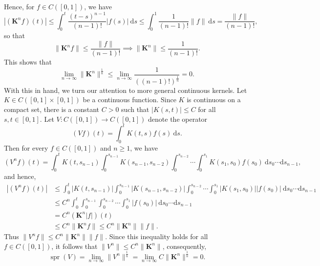 \documentclass[11pt]{article}
\theoremstyle{thmstyle}
\theoremstyle{defstyle}
\renewcommand{\le}{\leqslant}
\renewcommand{\ge}{\geqslant}
\newcommand{\spr}{\operatorname{spr}}
\begin{document}
Hence, for $f\in C([0, 1])$, we have 
\begin{equation*}
    \left|(\mathbf K^n f)(t)\right|\le\int_0^t\frac{(t - s)^{n - 1}}{(n - 1)!}|f(s)|~\mathrm ds\le\int_0^1\frac{1}{(n - 1)!}\|f\|~\mathrm ds = \frac{\|f\|}{(n - 1)!},
\end{equation*}
so that 
\begin{equation*}
    \|\mathbf K^n f\|\le\frac{\|f\|}{(n - 1)!}\implies\|\mathbf K^n\|\le\frac{1}{(n - 1)!}.
\end{equation*}
This shows that 
\begin{equation*}
    \lim_{n\to\infty}\|\mathbf K^n\|^{\frac{1}{n}}\le\lim_{n\to\infty}\frac{1}{\left((n - 1)!\right)^{\frac{1}{n}}} = 0.
\end{equation*}
With this in hand, we turn our attention to more general continuous kernels. Let $K\in C\left([0, 1]\times [0, 1]\right)$ be a continuous function. Since $K$ is continuous on a compact set, there is a constant $C > 0$ such that $|K(s, t)|\le C$ for all $s, t\in [0, 1]$. Let $V\colon C([0, 1])\to C([0, 1])$ denote the operator 
\begin{equation*}
    (Vf)(t) = \int_0^t K(t, s)f(s)~\mathrm ds.
\end{equation*}
Then for every $f\in C([0, 1])$ and $n\ge 1$, we have 
\begin{equation*}
    (V^nf)(t) = \int_0^t K(t, s_{n - 1})\int_0^{s_{n - 1}}K(s_{n - 1}, s_{n - 2})\int_0^{s_{n - 2}}\cdots\int_0^{s_1} K(s_1, s_0) f(s_0)~\mathrm ds_0\cdots\mathrm ds_{n - 1},
\end{equation*}
and hence, 
\begin{align*}
    \left|(V^n f)(t)\right|&\le\int_0^t |K(t, s_{n - 1})|\int_0^{s_{n - 1}} |K(s_{n - 1}, s_{n - 2})| \int_0^{s_{n - 2}}\cdots\int_0^{s_1} |K(s_1, s_0)||f(s_0)|~\mathrm ds_0\cdots\mathrm ds_{n - 1}\\
    &\le C^n\int_0^t \int_0^{s_{n - 1}}\int_0^{s_{n - 2}}\cdots\int_0^{s_1}|f(s_0)|~\mathrm ds_0\cdots\mathrm ds_{n - 1}\\
    &= C^n\left(\mathbf K^n|f|\right)(t)\\
    &\le C^n\|\mathbf K^n f\|\le C^n\|\mathbf K^n\|\|f\|.
\end{align*}
Thus $\|V^n f\|\le C^n\|\mathbf K^n\|\|f\|$. Since this inequality holds for all $f\in C([0, 1])$, it follows that $\|V^n\|\le C^n\|\mathbf K^n\|$, consequently, 
\begin{equation*}
    \spr(V) = \lim_{n\to\infty}\|V^n\|^{\frac{1}{n}} = \lim_{n\to\infty} C\|\mathbf K^n\|^{\frac{1}{n}} = 0.
\end{equation*}
\end{document}

